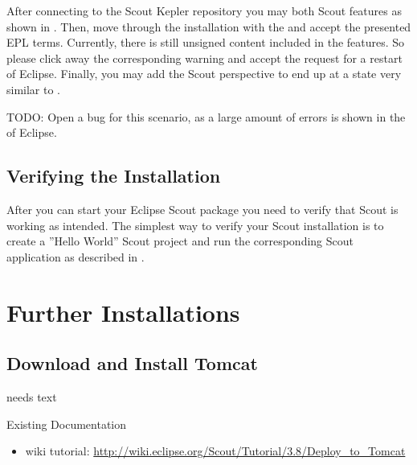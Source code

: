 \documentclass[a4paper,10pt,twoside]{book}
\begin{document}
After connecting to the Scout Kepler repository you may both Scout features as shown in .
Then, move through the installation with the  and accept the presented EPL terms.
Currently, there is still unsigned content included in the features.
So please click away the corresponding warning and accept the request for a restart of Eclipse.
Finally, you may add the Scout perspective to end up at a state very similar to .

TODO: Open a bug for this scenario, as a large amount of errors is shown in the  of Eclipse.


\section{Verifying the Installation}

After you can start your Eclipse Scout package you need to verify that Scout is working as intended.
The simplest way to verify your Scout installation is to create a ''Hello World'' Scout project and run the corresponding Scout application as described in .

\chapter{Further Installations}

\section{Download and Install Tomcat}
needs text

\noindent Existing Documentation
\begin{itemize}
  \item wiki tutorial: \url{http://wiki.eclipse.org/Scout/Tutorial/3.8/Deploy_to_Tomcat}
\end{itemize}
\end{document}
